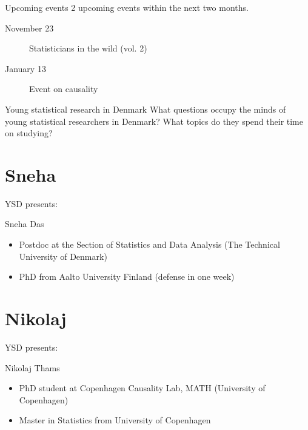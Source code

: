 \documentclass[14pt]{beamer}\usepackage{listings}
\begin{document}
\begin{frame}[label={sec:org2020877}]{Upcoming events}
2 upcoming events within the next two months.

\vfill

\begin{description}
\item[{November 23}] Statisticians in the wild (vol. 2)
\item[{January 13}] Event on causality
\end{description}

\vfill
\end{frame}

\begin{frame}[label={sec:org838907e}]{Young statistical research in Denmark}
What questions occupy the minds of young statistical researchers in Denmark? What topics do they
spend their time on studying?
\end{frame}

\section{Sneha}
\label{sec:orgf26f6cb}
\begin{frame}[label={sec:org3654c08}]{YSD presents:}
\begin{block}{\centering Sneha Das}
\small
\begin{itemize}
\item Postdoc at the Section of Statistics and Data Analysis (The Technical University of Denmark)
\item PhD from Aalto University Finland (defense in one week)
\end{itemize}
\end{block}
\end{frame}
\begin{frame}[label={sec:orgb9e2213}]{}
\end{frame}
\section{Nikolaj}
\label{sec:org02c02e1}
\begin{frame}[label={sec:org77db46e}]{YSD presents:}
\begin{block}{\centering Nikolaj Thams}
\small
\begin{itemize}
\item PhD student at Copenhagen Causality Lab, MATH (University of Copenhagen)
\item Master in Statistics from University of Copenhagen
\end{itemize}
\end{block}
\end{frame}
\end{document}

